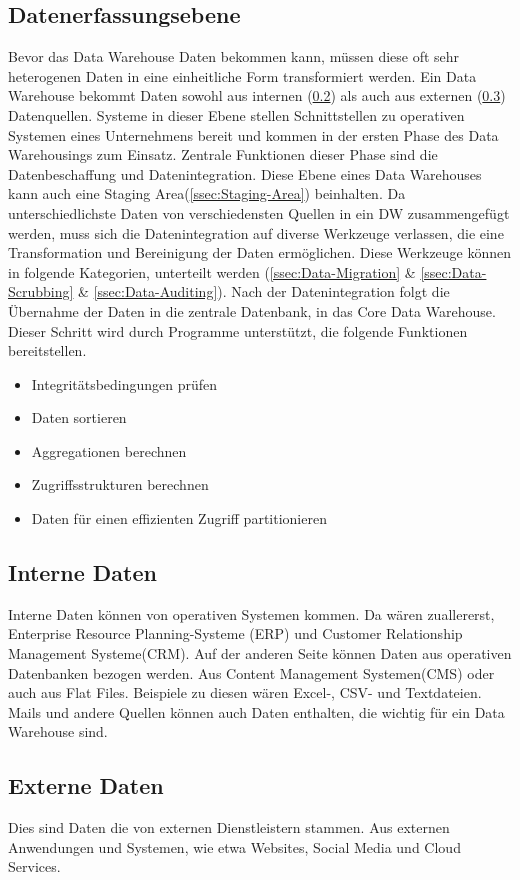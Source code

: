 \subsection{Datenerfassungsebene}
Bevor das Data Warehouse Daten bekommen kann, müssen diese oft sehr heterogenen Daten in eine einheitliche Form transformiert werden. Ein Data Warehouse bekommt Daten sowohl aus internen (\ref{ssec:Interne-Daten}) als auch aus externen (\ref{ssec:Externe-Daten}) Datenquellen. Systeme in dieser Ebene stellen Schnittstellen zu operativen Systemen eines Unternehmens bereit und kommen in der ersten Phase des Data Warehousings zum Einsatz. Zentrale Funktionen dieser Phase sind die Datenbeschaffung und Datenintegration. Diese Ebene eines Data Warehouses kann auch eine Staging Area(\ref{ssec:Staging-Area}) beinhalten. Da unterschiedlichste Daten von verschiedensten Quellen in ein DW zusammengefügt werden, muss sich die Datenintegration auf diverse Werkzeuge verlassen, die eine Transformation und Bereinigung der Daten ermöglichen. Diese Werkzeuge können in folgende Kategorien, unterteilt werden (\ref{ssec:Data-Migration} \& \ref{ssec:Data-Scrubbing} \& \ref{ssec:Data-Auditing}). Nach der Datenintegration folgt die Übernahme der Daten in die zentrale Datenbank, in das Core Data Warehouse. Dieser Schritt wird durch Programme unterstützt, die folgende Funktionen bereitstellen.
\begin{itemize}
\item Integritätsbedingungen prüfen
\item Daten sortieren
\item Aggregationen berechnen
\item Zugriffsstrukturen berechnen
\item Daten für einen effizienten Zugriff partitionieren
\end{itemize}
\subsection{Interne Daten}\label{ssec:Interne-Daten}
Interne Daten können von operativen Systemen kommen. Da wären zuallererst, Enterprise Resource Planning-Systeme (ERP) und Customer Relationship Management Systeme(CRM). Auf der anderen Seite können Daten aus operativen Datenbanken bezogen werden. Aus Content Management Systemen(CMS) oder auch aus Flat Files. Beispiele zu diesen wären Excel-, CSV- und Textdateien. Mails und andere Quellen können auch Daten enthalten, die wichtig für ein Data Warehouse sind.
\subsection{Externe Daten}\label{ssec:Externe-Daten}
Dies sind Daten die von externen Dienstleistern stammen. Aus externen Anwendungen und Systemen, wie etwa Websites, Social Media und Cloud Services.
